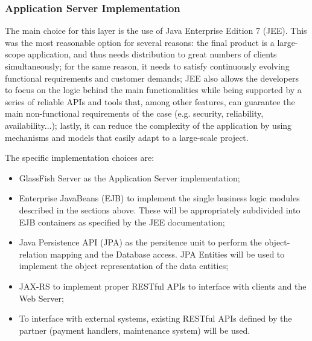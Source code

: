 \subsubsection{Application Server Implementation}
The main choice for this layer is the use of Java Enterprise Edition 7 (JEE). This was the most reasonable option for several reasons: the final product is a large-scope application, and thus needs distribution to great numbers of clients simultaneously; for the same reason, it needs to satisfy continuously evolving functional requirements and customer demands; JEE also allows the developers to focus on the logic behind the main functionalities while being supported by a series of reliable APIs and tools that, among other features, can guarantee the main non-functional requirements of the case (e.g. security, reliability, availability...); lastly, it can reduce the complexity of the application by using mechanisms and models that easily adapt to a large-scale project.

The specific implementation choices are:
\begin{itemize}
\item GlassFish Server as the Application Server implementation;
\item Enterprise JavaBeans (EJB) to implement the single business logic modules described in the sections above. These will be appropriately subdivided into EJB containers as specified by the JEE documentation;
\item Java Persistence API (JPA) as the persitence unit to perform the object-relation mapping and the Database access. JPA Entities will be used to implement the object representation of the data entities;
\item JAX-RS to implement proper RESTful APIs to interface with clients and the Web Server;
\item To interface with external systems, existing RESTful APIs defined by the partner (payment handlers, maintenance system) will be used.
\end{itemize}


